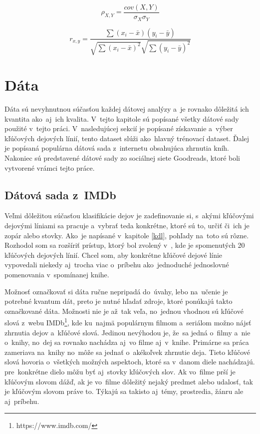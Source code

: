 \begin{equation}
	\rho_{X,Y} =  \dfrac{cov(X,Y)}{\sigma_{X} \sigma_{Y}} \label{rovnicaPearson}
\end{equation}

\begin{equation}
	r_{x,y} =  \dfrac{\sum{(x_{i}-\bar{x})(y_{i}-\bar{y})}}{\sqrt{\sum{(x_{i}-\bar{x})^2}} \sqrt{\sum{(y_{i}-\bar{y})^2}}} \label{rovnicaSpearman}
\end{equation}


\chapter{Dáta} \label{data}
Dáta sú nevyhnutnou súčasťou každej dátovej analýzy a~je rovnako dôležitá ich kvantita ako~aj~ich kvalita. V~tejto kapitole sú popísané všetky dátové sady použité v~tejto práci. V~nasledujúcej sekcií je popísané získavanie a~výber kľúčových dejových línií, tento dataset slúži ako~hlavný trénovací dataset. Ďalej je popísaná populárna dátová sada z~internetu obsahujúca zhrnutia kníh. Nakoniec sú predstavené dátové sady zo sociálnej siete Goodreads, ktoré boli vytvorené vrámci tejto práce.

\section{Dátová sada z~IMDb} \label{imdbdata}
Veľmi dôležitou súčasťou klasifikácie dejov je zadefinovanie si, s~akými kľúčovými dejovými líniami sa pracuje a~vybrať teda konkrétne, ktoré sú to, určiť či~ich je zopár alebo stovky. Ako~je napísané v~kapitole \ref{kdl}, pohľady na~toto sú rôzne. Rozhodol som sa rozšíriť prístup, ktorý bol zvolený v~\cite{Tobias:1993}, kde je spomenutých 20 kľúčových dejových línií. Chcel som, aby konkrétne kľúčové dejové línie vypovedali niekedy aj~trocha viac o~príbehu ako~jednoduché jednoslovné pomenovania v~spomínanej knihe.

Možnosť označkovať si dáta ručne nepripadá do~úvahy, lebo na~učenie je potrebné kvantum dát, preto je nutné hľadať zdroje, ktoré ponúkajú takto označkované dáta. Možnosti nie je až~tak veľa, no~jednou vhodnou sú kľúčové slová z~webu IMDb\footnote{https://www.imdb.com/}, kde ku~najmä populárnym filmom a~seriálom možno nájsť zhrnutia dejov a~kľúčové slová. Jedinou nevýhodou je, že~sa jedná o~filmy a~nie o~knihy, no~dej sa rovnako nachádza aj~vo filme aj~v~knihe. Primárne sa práca zameriava na~knihy no~môže sa jednať o~akékoľvek zhrnutie deja. Tieto kľúčové slová hovoria o~všetkých možných aspektoch, ktoré sa v~danom diele nachádzajú. pre~konkrétne dielo môžu byť aj~stovky kľúčových slov. Ak vo~filme prší je kľúčovým slovom dážď, ak je vo~filme dôležitý nejaký predmet alebo udalosť, tak je kľúčovým slovom práve to. Týkajú sa takisto aj~témy, prostredia, žánru ale aj~príbehu.

